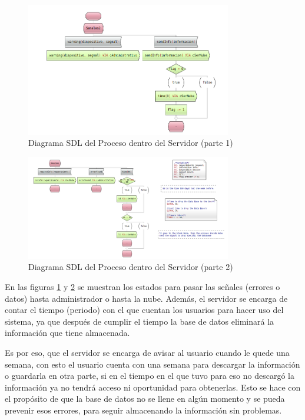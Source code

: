 \begin{figure}[h]
    \centering
    \includegraphics[width=0.8\textwidth]{images/SDL_ProcesoAcciones1.png}
    \caption{Diagrama SDL del Proceso dentro del Servidor (parte 1)}
    \label{SDL_Pservidor1}
\end{figure}

\begin{figure}[h]
    \centering
    \includegraphics[width=0.8\textwidth]{images/SDL_ProcesoAcciones2.png}
    \caption{Diagrama SDL del Proceso dentro del Servidor (parte 2)}
    \label{SDL_Pservidor2}
\end{figure}

En las figuras \ref{SDL_Pservidor1} y \ref{SDL_Pservidor2} se muestran los estados para pasar las señales (errores o datos) hasta administrador o hasta la nube. Además, el servidor se encarga de contar el tiempo (periodo) con el que cuentan los usuarios para hacer uso del sistema, ya que después de cumplir el tiempo la base de datos eliminará la información que tiene almacenada.

Es por eso, que el servidor se encarga de avisar al usuario cuando le quede una semana, con esto el usuario cuenta con una semana para descargar la información o guardarla en otra parte, si en el tiempo en el que tuvo para eso no descargó la información ya no tendrá acceso ni oportunidad para obtenerlas. Esto se hace con el propósito de que la base de datos no se llene en algún momento y se pueda prevenir esos errores, para seguir almacenando la información sin problemas.

